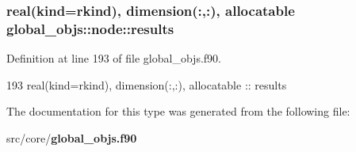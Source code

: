 \subsubsection[{results}]{\setlength{\rightskip}{0pt plus 5cm}real(kind=rkind), dimension(\+:,\+:), allocatable global\+\_\+objs\+::node\+::results}\label{structglobal__objs_1_1node_a9b6924f22b00e9284a3cf94acbe42b21}


Definition at line 193 of file global\+\_\+objs.\+f90.


\begin{DoxyCode}
193     \textcolor{keywordtype}{real(kind=rkind)}, \textcolor{keywordtype}{dimension(:,:)}, \textcolor{keywordtype}{allocatable}  :: results
\end{DoxyCode}


The documentation for this type was generated from the following file\+:\begin{DoxyCompactItemize}
\item 
src/core/{\bf global\+\_\+objs.\+f90}\end{DoxyCompactItemize}
